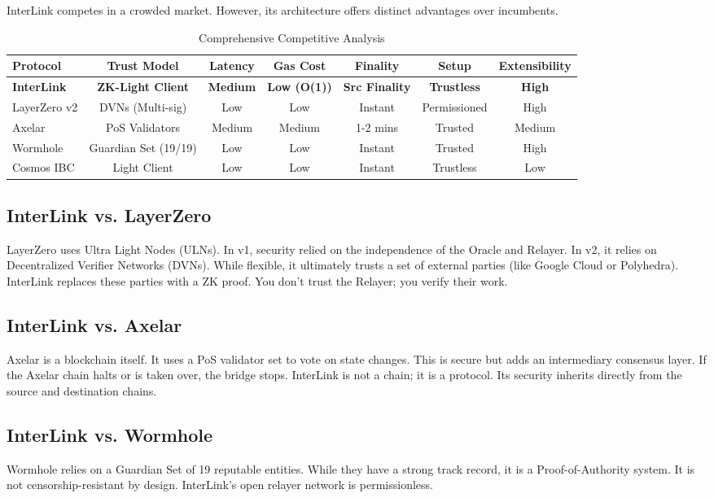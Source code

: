 \documentclass[11pt,a4paper]{article}
\begin{document}
InterLink competes in a crowded market. However, its architecture offers distinct advantages over incumbents.

\begin{table}[H]
\centering
\small
\begin{tabular}{@{}lcccccc@{}}
\toprule
\textbf{Protocol} & \textbf{Trust Model} & \textbf{Latency} & \textbf{Gas Cost} & \textbf{Finality} & \textbf{Setup} & \textbf{Extensibility} \\ \midrule
\textbf{InterLink} & \textbf{ZK-Light Client} & \textbf{Medium} & \textbf{Low (O(1))} & \textbf{Src Finality} & \textbf{Trustless} & \textbf{High} \\
LayerZero v2 & DVNs (Multi-sig) & Low & Low & Instant & Permissioned & High \\
Axelar & PoS Validators & Medium & Medium & 1-2 mins & Trusted & Medium \\
Wormhole & Guardian Set (19/19) & Low & Low & Instant & Trusted & High \\
Cosmos IBC & Light Client & Low & Low & Instant & Trustless & Low \\ \bottomrule
\end{tabular}
\caption{Comprehensive Competitive Analysis}
\label{tab:comparison_detailed}
\end{table}

\subsection{InterLink vs. LayerZero}
LayerZero uses Ultra Light Nodes (ULNs). In v1, security relied on the independence of the Oracle and Relayer. In v2, it relies on Decentralized Verifier Networks (DVNs). While flexible, it ultimately trusts a set of external parties (like Google Cloud or Polyhedra). InterLink replaces these parties with a ZK proof. You don't trust the Relayer; you verify their work.

\subsection{InterLink vs. Axelar}
Axelar is a blockchain itself. It uses a PoS validator set to vote on state changes. This is secure but adds an intermediary consensus layer. If the Axelar chain halts or is taken over, the bridge stops. InterLink is not a chain; it is a protocol. Its security inherits directly from the source and destination chains.

\subsection{InterLink vs. Wormhole}
Wormhole relies on a Guardian Set of 19 reputable entities. While they have a strong track record, it is a Proof-of-Authority system. It is not censorship-resistant by design. InterLink's open relayer network is permissionless.
\end{document}
